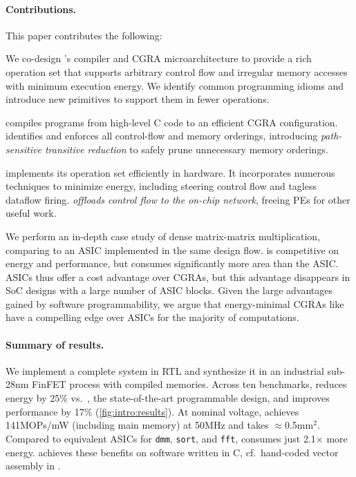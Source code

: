 \paragraph{Contributions.}
This paper contributes the following:
\begin{compactitem}

\item {} We co-design \riptide's
  compiler and CGRA microarchitecture to provide a rich operation set
  that supports arbitrary control flow and irregular memory accesses
  with minimum execution energy.
  We identify common programming idioms and introduce new primitives
  to support them in fewer operations.
  
\item {} \riptide compiles programs from high-level C code
  to an efficient CGRA configuration. \riptide identifies and enforces all
  control-flow and memory orderings, introducing \emph{path-sensitive
  transitive reduction} to safely prune unnecessary memory orderings.
  
\item {} \riptide implements its operation set
  efficiently in hardware. It incorporates numerous techniques to
  minimize energy, including steering control flow and tagless
  dataflow firing. \riptide \emph{offloads control flow to the
  on-chip network}, freeing PEs for other useful work.
  
\item {} We perform
  an in-depth case study of dense matrix-matrix multiplication,
  comparing \riptide to an ASIC implemented in the same design flow. \riptide
  is competitive on energy and performance, but consumes significantly
  more area than the ASIC.
  ASICs thus offer a cost advantage over CGRAs, but this
  advantage disappears in SoC designs with a large number of ASIC
  blocks. Given the large advantages gained by software
  programmability, we argue that energy-minimal CGRAs like \riptide have a
  compelling edge over ASICs for the majority of computations.
\end{compactitem}

\figRipTideIntroResults
\paragraph{Summary of results.}
%
We implement a complete \riptide system in RTL and synthesize it in an
industrial sub-28nm FinFET process with compiled memories.
%
Across ten benchmarks, \riptide reduces energy by
25\% vs.\ \snafu, the state-of-the-art programmable design,
and improves performance by 17\% (\autoref{fig:intro:results}).
%
At nominal voltage, \riptide achieves 141MOPs/mW (including main memory) at 50MHz
and takes $\approx$0.5mm$^2$.
%
Compared to equivalent ASICs for {\tt dmm}, {\tt sort}, and {\tt fft},
\riptide consumes just 2.1$\times$ more energy.
%
\riptide achieves these benefits on software written in C, cf.\ hand-coded
vector assembly in \snafu.


